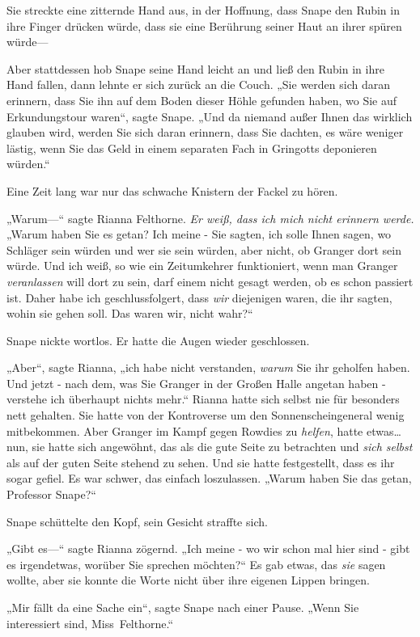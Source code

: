 {Sie streckte eine zitternde Hand aus, in der Hoffnung, dass Snape den Rubin in ihre Finger drücken würde, dass sie eine Berührung seiner Haut an ihrer spüren würde—

Aber stattdessen hob Snape seine Hand leicht an und ließ den Rubin in ihre Hand fallen, dann lehnte er sich zurück an die Couch. „Sie werden sich daran erinnern, dass Sie ihn auf dem Boden dieser Höhle gefunden haben, wo Sie auf Erkundungstour waren“, sagte Snape. „Und da niemand außer Ihnen das wirklich glauben wird, werden Sie sich daran erinnern, dass Sie dachten, es wäre weniger lästig, wenn Sie das Geld in einem separaten Fach in Gringotts deponieren würden.“

Eine Zeit lang war nur das schwache Knistern der Fackel zu hören.

„Warum—“ sagte Rianna Felthorne. \emph{Er weiß, dass ich mich nicht erinnern werde.} „Warum haben Sie es getan? Ich meine - Sie sagten, ich solle Ihnen sagen, wo Schläger sein würden und wer sie sein würden, aber nicht, ob Granger dort sein würde. Und ich weiß, so wie ein Zeitumkehrer funktioniert, wenn man Granger \emph{veranlassen} will dort zu sein, darf einem nicht gesagt werden, ob es schon passiert ist. Daher habe ich geschlussfolgert, dass \emph{wir} diejenigen waren, die ihr sagten, wohin sie gehen soll. Das waren wir, nicht wahr?“

Snape nickte wortlos. Er hatte die Augen wieder geschlossen.

„Aber“, sagte Rianna, „ich habe nicht verstanden, \emph{warum} Sie ihr geholfen haben. Und jetzt - nach dem, was Sie Granger in der Großen Halle angetan haben - verstehe ich überhaupt nichts mehr.“ Rianna hatte sich selbst nie für besonders nett gehalten. Sie hatte von der Kontroverse um den Sonnenscheingeneral wenig mitbekommen. Aber Granger im Kampf gegen Rowdies zu \emph{helfen}, hatte etwas…nun, sie hatte sich angewöhnt, das als die gute Seite zu betrachten und \emph{sich selbst} als auf der guten Seite stehend zu sehen. Und sie hatte festgestellt, dass es ihr sogar gefiel. Es war schwer, das einfach loszulassen. „Warum haben Sie das getan, Professor Snape?“

Snape schüttelte den Kopf, sein Gesicht straffte sich.

„Gibt es—“ sagte Rianna zögernd. „Ich meine - wo wir schon mal hier sind - gibt es irgendetwas, worüber Sie sprechen möchten?“ Es gab etwas, das \emph{sie} sagen wollte, aber sie konnte die Worte nicht über ihre eigenen Lippen bringen.

„Mir fällt da eine Sache ein“, sagte Snape nach einer Pause. „Wenn Sie interessiert sind, Miss~Felthorne.“

}

